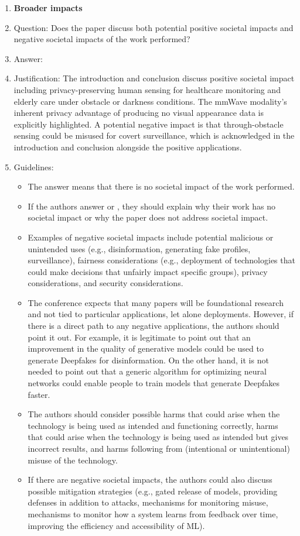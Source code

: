 \begin{enumerate}
\item {\bf Broader impacts}
    \item[] Question: Does the paper discuss both potential positive societal impacts and negative societal impacts of the work performed?
    \item[] Answer: \answerYes{}
    \item[] Justification: The introduction and conclusion discuss positive societal impact including privacy-preserving human sensing for healthcare monitoring and elderly care under obstacle or darkness conditions. The mmWave modality's inherent privacy advantage of producing no visual appearance data is explicitly highlighted. A potential negative impact is that through-obstacle sensing could be misused for covert surveillance, which is acknowledged in the introduction and conclusion alongside the positive applications.
    \item[] Guidelines:
    \begin{itemize}
        \item The answer \answerNA{} means that there is no societal impact of the work performed.
        \item If the authors answer \answerNA{} or \answerNo, they should explain why their work has no societal impact or why the paper does not address societal impact.
        \item Examples of negative societal impacts include potential malicious or unintended uses (e.g., disinformation, generating fake profiles, surveillance), fairness considerations (e.g., deployment of technologies that could make decisions that unfairly impact specific groups), privacy considerations, and security considerations.
        \item The conference expects that many papers will be foundational research and not tied to particular applications, let alone deployments. However, if there is a direct path to any negative applications, the authors should point it out. For example, it is legitimate to point out that an improvement in the quality of generative models could be used to generate Deepfakes for disinformation. On the other hand, it is not needed to point out that a generic algorithm for optimizing neural networks could enable people to train models that generate Deepfakes faster.
        \item The authors should consider possible harms that could arise when the technology is being used as intended and functioning correctly, harms that could arise when the technology is being used as intended but gives incorrect results, and harms following from (intentional or unintentional) misuse of the technology.
        \item If there are negative societal impacts, the authors could also discuss possible mitigation strategies (e.g., gated release of models, providing defenses in addition to attacks, mechanisms for monitoring misuse, mechanisms to monitor how a system learns from feedback over time, improving the efficiency and accessibility of ML).
    \end{itemize}


\end{enumerate}
